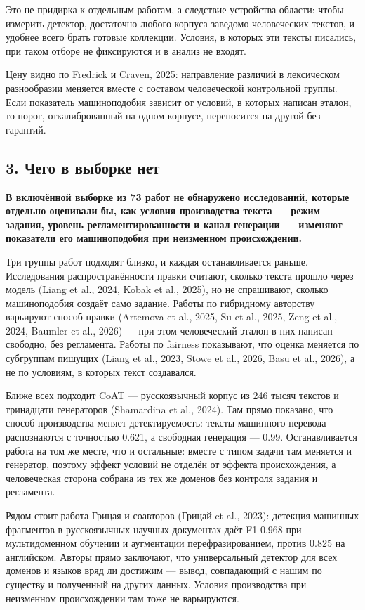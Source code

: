 \documentclass[11pt,a4paper]{article}
\renewcommand{\_}{\textunderscore\allowbreak}
\begin{document}
Это не придирка к отдельным работам, а следствие устройства области: чтобы
измерить детектор, достаточно любого корпуса заведомо человеческих текстов, и
удобнее всего брать готовые коллекции. Условия, в которых эти тексты писались,
при таком отборе не фиксируются и в анализ не входят.

Цену видно по Fredrick и Craven, 2025: направление различий в лексическом разнообразии меняется
вместе с составом человеческой контрольной группы. Если показатель машиноподобия
зависит от условий, в которых написан эталон, то порог, откалиброванный на одном
корпусе, переносится на другой без гарантий.

\subsection{3. Чего в выборке нет}

\textbf{В включённой выборке из 73 работ не обнаружено исследований, которые отдельно
оценивали бы, как условия производства текста — режим задания, уровень
регламентированности и канал генерации — изменяют показатели его машиноподобия
при неизменном происхождении.}

Три группы работ подходят близко, и каждая останавливается раньше. Исследования
распространённости правки считают, сколько текста прошло через модель (Liang et al., 2024,
Kobak et al., 2025), но не спрашивают, сколько машиноподобия создаёт само задание. Работы по
гибридному авторству варьируют способ правки (Artemova et al., 2025, Su et al., 2025, Zeng et al., 2024, Baumler et al., 2026) — при этом
человеческий эталон в них написан свободно, без регламента. Работы по fairness
показывают, что оценка меняется по субгруппам пишущих (Liang et al., 2023, Stowe et al., 2026, Basu et al., 2026), а не по
условиям, в которых текст создавался.

Ближе всех подходит CoAT — русскоязычный корпус из 246 тысяч текстов и
тринадцати генераторов (Shamardina et al., 2024). Там прямо показано, что способ производства меняет
детектируемость: тексты машинного перевода распознаются с точностью 0.621, а
свободная генерация — 0.99. Останавливается работа
на том же месте, что и остальные: вместе с типом задачи там меняется и генератор,
поэтому эффект условий не отделён от эффекта происхождения, а человеческая
сторона собрана из тех же доменов без контроля задания и регламента.

Рядом стоит работа Грицая и соавторов (Грицай et al., 2023): детекция машинных фрагментов в
русскоязычных научных документах даёт F1 0.968 при мультидоменном обучении и
аугментации перефразированием, против 0.825 на английском. Авторы прямо заключают,
что универсальный детектор для всех доменов и языков вряд ли достижим — вывод,
совпадающий с нашим по существу и полученный на других данных. Условия
производства при неизменном происхождении там тоже не варьируются.
\end{document}
